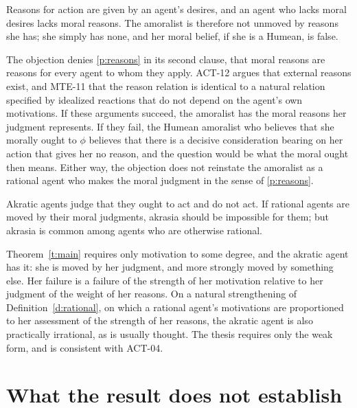\documentclass{situationist-preprint}
\begin{document}
\begin{objection}
Reasons for action are given by an agent's desires, and an agent who lacks moral desires lacks moral reasons. The amoralist is therefore not unmoved by reasons she has; she simply has none, and her moral belief, if she is a Humean, is false.
\end{objection}

\begin{reply}
The objection denies \ref{p:reasons} in its second clause, that moral reasons are reasons for every agent to whom they apply. ACT-12 argues that external reasons exist, and MTE-11 that the reason relation is identical to a natural relation specified by idealized reactions that do not depend on the agent's own motivations. If these arguments succeed, the amoralist has the moral reasons her judgment represents. If they fail, the Humean amoralist who believes that she morally ought to $\phi$ believes that there is a decisive consideration bearing on her action that gives her no reason, and the question would be what the moral ought then means. Either way, the objection does not reinstate the amoralist as a rational agent who makes the moral judgment in the sense of \ref{p:reasons}.
\end{reply}

\begin{objection}
Akratic agents judge that they ought to act and do not act. If rational agents are moved by their moral judgments, akrasia should be impossible for them; but akrasia is common among agents who are otherwise rational.
\end{objection}

\begin{reply}
Theorem~\ref{t:main} requires only motivation to some degree, and the akratic agent has it: she is moved by her judgment, and more strongly moved by something else. Her failure is a failure of the strength of her motivation relative to her judgment of the weight of her reasons. On a natural strengthening of Definition~\ref{d:rational}, on which a rational agent's motivations are proportioned to her assessment of the strength of her reasons, the akratic agent is also practically irrational, as is usually thought. The thesis requires only the weak form, and is consistent with ACT-04.
\end{reply}

\section{What the result does not establish}
\end{document}
